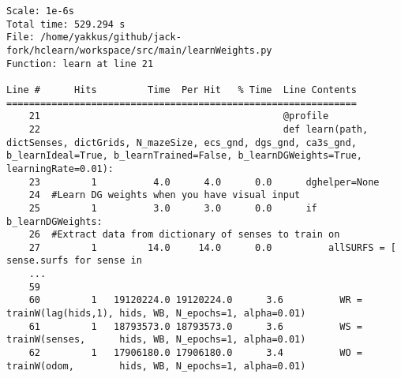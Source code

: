 \begin{minipage}{\linewidth}
\begin{lstlisting}[caption={Example output from the line profiler tool, showing part of the learn function of the model.}, label=profiling:line_learn]
Scale: 1e-6s
Total time: 529.294 s
File: /home/yakkus/github/jack-fork/hclearn/workspace/src/main/learnWeights.py
Function: learn at line 21

Line #      Hits         Time  Per Hit   % Time  Line Contents
==============================================================
    21                                           @profile
    22                                           def learn(path, dictSenses, dictGrids, N_mazeSize, ecs_gnd, dgs_gnd, ca3s_gnd, b_learnIdeal=True, b_learnTrained=False, b_learnDGWeights=True, learningRate=0.01):
    23         1          4.0      4.0      0.0      dghelper=None
    24  #Learn DG weights when you have visual input
    25         1          3.0      3.0      0.0      if b_learnDGWeights:
    26  #Extract data from dictionary of senses to train on 
    27         1         14.0     14.0      0.0          allSURFS = [ sense.surfs for sense in 
    ...
    59                                           
    60         1   19120224.0 19120224.0      3.6          WR = trainW(lag(hids,1), hids, WB, N_epochs=1, alpha=0.01)
    61         1   18793573.0 18793573.0      3.6          WS = trainW(senses,      hids, WB, N_epochs=1, alpha=0.01)
    62         1   17906180.0 17906180.0      3.4          WO = trainW(odom,        hids, WB, N_epochs=1, alpha=0.01)
\end{lstlisting}
\end{minipage}
